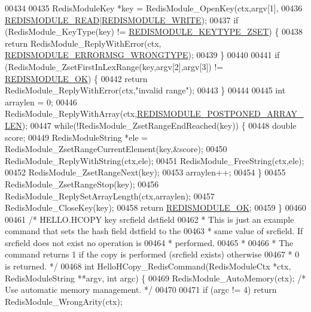 \begin{DoxyCode}
00434 
00435     RedisModuleKey *key = RedisModule\_OpenKey(ctx,argv[1],
00436         \hyperlink{redismodule_8h_a369d2ff4bca768b05f826a12dd694825}{REDISMODULE\_READ}|\hyperlink{redismodule_8h_a73b37117ef94cb4a904361afcc51b6b4}{REDISMODULE\_WRITE});
00437     \textcolor{keywordflow}{if} (RedisModule\_KeyType(key) != \hyperlink{redismodule_8h_a93d1514d4c11cc65551b36cfd9a72cc2}{REDISMODULE\_KEYTYPE\_ZSET}) \{
00438         \textcolor{keywordflow}{return} RedisModule\_ReplyWithError(ctx,
      \hyperlink{redismodule_8h_ab897689b0673a1e4cbc097cb5bce04c1}{REDISMODULE\_ERRORMSG\_WRONGTYPE});
00439     \}
00440 
00441     \textcolor{keywordflow}{if} (RedisModule\_ZsetFirstInLexRange(key,argv[2],argv[3]) != 
      \hyperlink{redismodule_8h_a1bc5bfd69abcd378ff52c640adc5418d}{REDISMODULE\_OK}) \{
00442         \textcolor{keywordflow}{return} RedisModule\_ReplyWithError(ctx,\textcolor{stringliteral}{"invalid range"});
00443     \}
00444 
00445     \textcolor{keywordtype}{int} arraylen = 0;
00446     RedisModule\_ReplyWithArray(ctx,\hyperlink{redismodule_8h_af07005134cbf107aad1c8e0ded8fcf2b}{REDISMODULE\_POSTPONED\_ARRAY\_LEN});
00447     \textcolor{keywordflow}{while}(!RedisModule\_ZsetRangeEndReached(key)) \{
00448         \textcolor{keywordtype}{double} score;
00449         RedisModuleString *ele = RedisModule\_ZsetRangeCurrentElement(key,&score);
00450         RedisModule\_ReplyWithString(ctx,ele);
00451         RedisModule\_FreeString(ctx,ele);
00452         RedisModule\_ZsetRangeNext(key);
00453         arraylen++;
00454     \}
00455     RedisModule\_ZsetRangeStop(key);
00456     RedisModule\_ReplySetArrayLength(ctx,arraylen);
00457     RedisModule\_CloseKey(key);
00458     \textcolor{keywordflow}{return} \hyperlink{redismodule_8h_a1bc5bfd69abcd378ff52c640adc5418d}{REDISMODULE\_OK};
00459 \}
00460 
00461 \textcolor{comment}{/* HELLO.HCOPY key srcfield dstfield}
00462 \textcolor{comment}{ * This is just an example command that sets the hash field dstfield to the}
00463 \textcolor{comment}{ * same value of srcfield. If srcfield does not exist no operation is}
00464 \textcolor{comment}{ * performed.}
00465 \textcolor{comment}{ *}
00466 \textcolor{comment}{ * The command returns 1 if the copy is performed (srcfield exists) otherwise}
00467 \textcolor{comment}{ * 0 is returned. */}
00468 \textcolor{keywordtype}{int} HelloHCopy\_RedisCommand(RedisModuleCtx *ctx, RedisModuleString **argv, \textcolor{keywordtype}{int} argc) \{
00469     RedisModule\_AutoMemory(ctx); \textcolor{comment}{/* Use automatic memory management. */}
00470 
00471     \textcolor{keywordflow}{if} (argc != 4) \textcolor{keywordflow}{return} RedisModule\_WrongArity(ctx);

\end{DoxyCode}

